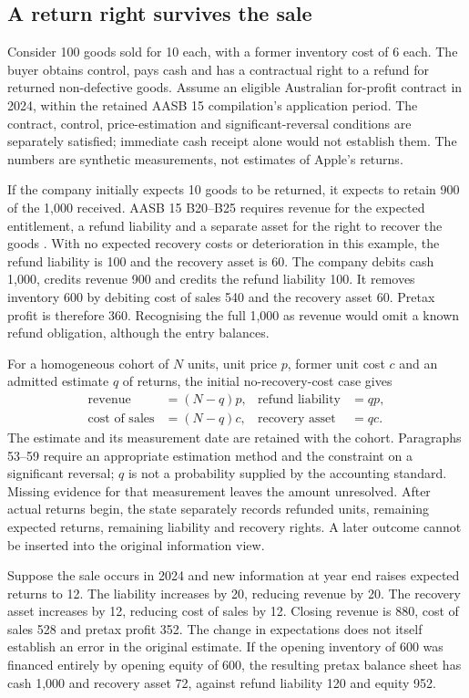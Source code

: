 \subsection{A return right survives the sale}
\label{sec:customer-returns}

Consider 100 goods sold for 10 each, with a former inventory cost of 6 each.
The buyer obtains control, pays cash and has a contractual right to a refund
for returned non-defective goods. Assume an eligible Australian for-profit
contract in 2024, within the retained AASB 15 compilation's application period.
The contract, control, price-estimation and significant-reversal conditions
are separately satisfied; immediate cash receipt alone would not establish
them. The numbers are synthetic measurements, not estimates of Apple's returns.

If the company initially expects 10 goods to be returned, it expects to retain
900 of the 1,000 received. AASB 15 B20--B25 requires revenue for the expected
entitlement, a refund liability and a separate asset for the right to recover
the goods \citep{aasb15dated}. With no expected recovery costs or deterioration
in this example, the refund liability is 100 and the recovery asset is 60.
The company debits cash 1,000, credits revenue 900 and credits the refund
liability 100. It removes inventory 600 by debiting cost of sales 540 and the
recovery asset 60. Pretax profit is therefore 360. Recognising the full 1,000
as revenue would omit a known refund obligation, although the entry balances.

For a homogeneous cohort of $N$ units, unit price $p$, former unit cost $c$ and
an admitted estimate $q$ of returns, the initial no-recovery-cost case gives
\begin{align*}
 \text{revenue}&=(N-q)p, & \text{refund liability}&=qp,\\
 \text{cost of sales}&=(N-q)c, & \text{recovery asset}&=qc.
\end{align*}
The estimate and its measurement date are retained with the cohort. Paragraphs
53--59 require an appropriate estimation method and the constraint on a
significant reversal; $q$ is not a probability supplied by the accounting
standard. Missing evidence for that measurement leaves the amount unresolved.
After actual returns begin, the state separately records refunded units,
remaining expected returns, remaining liability and recovery rights. A later
outcome cannot be inserted into the original information view.

Suppose the sale occurs in 2024 and new information at year end raises expected
returns to 12. The liability increases by 20, reducing revenue by 20. The
recovery asset increases by 12, reducing cost of sales by 12. Closing revenue
is 880, cost of sales 528 and pretax profit 352. The change in expectations
does not itself establish an error in the original estimate. If the opening
inventory of 600 was financed entirely by opening equity of 600, the resulting
pretax balance sheet has cash 1,000 and recovery asset 72, against refund
liability 120 and equity 952.

